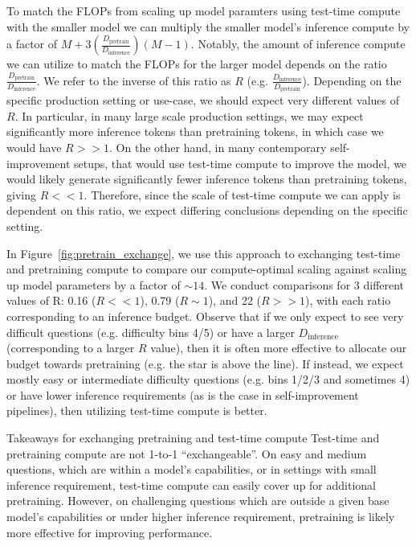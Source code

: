 \documentclass[11pt, letterpaper, logo]{googledeepmind}
\begin{document}
To match the FLOPs from scaling up model paramters using test-time compute with the smaller model we can multiply the smaller model's inference compute by a factor of $M + 3 \left(\frac{D_{\text{pretrain}}}{D_{\text{inference}}}\right)(M-1)$. Notably, the amount of inference compute we can utilize to match the FLOPs for the larger model depends on the ratio $\frac{D_{\text{pretrain}}}{D_{\text{inference}}}$. We refer to the inverse of this ratio as $R$ (e.g. $\frac{D_{\text{inference}}}{D_{\text{pretrain}}}$). Depending on the specific production setting or use-case, we should expect very different values of $R$. In particular, in many large scale production settings, we may expect significantly more inference tokens than pretraining tokens, in which case we would have $R >> 1$. On the other hand, in many contemporary self-improvement setups, that would use test-time compute to improve the model, we would likely generate significantly fewer inference tokens than pretraining tokens, giving $R << 1$. Therefore, since the scale of test-time compute we can apply is dependent on this ratio, we expect differing conclusions depending on the specific setting.

In Figure~\ref{fig:pretrain_exchange}, we use this approach to exchanging test-time and pretraining compute to compare our compute-optimal scaling against scaling up model parameters by a factor of $\sim14$. We conduct comparisons for 3 different values of R: 0.16 ($R << 1$), 0.79 ($R \sim 1$), and 22 ($R >> 1$), with each ratio corresponding to an inference budget. Observe that if we only expect to see very difficult questions (e.g. difficulty bins 4/5) or have a larger $D_{\text{inference}}$ (corresponding to a larger $R$ value), then it is often more effective to allocate our budget towards pretraining (e.g. the star is above the line). If instead, we expect mostly easy or intermediate difficulty questions (e.g. bins 1/2/3 and sometimes 4) or have lower inference requirements (as is the case in self-improvement pipelines), then utilizing test-time compute  is better.

\begin{AIbox}{Takeaways for exchanging pretraining and test-time compute}
Test-time and pretraining compute are not 1-to-1 ``exchangeable''. On easy and medium questions, which are within a model's capabilities, or in settings with small inference requirement, test-time compute can easily cover up for additional pretraining. However, on challenging questions which are outside a given base model's capabilities or under higher inference requirement, pretraining is  likely more effective for improving performance.
\end{AIbox}
\end{document}
